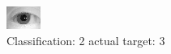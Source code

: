 \begin{figure}[h!]
\begin{center}
\includegraphics[width=0.60\columnwidth]{figures/ID1154_class_2_target_3.png}
\end{center}
\caption{ Classification: 2 actual target: 3}
\label{fig:ID1154_class_2_target_3}
\end{figure}
